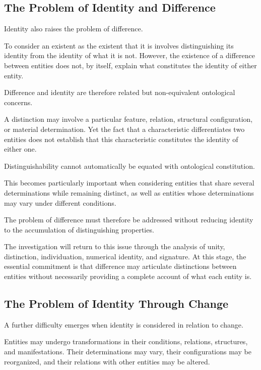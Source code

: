 \subsection{The Problem of Identity and Difference}

Identity also raises the problem of difference.

To consider an existent as the existent that
it is involves distinguishing its identity
from the identity of what it is not. However,
the existence of a difference between entities
does not, by itself, explain what constitutes
the identity of either entity.

Difference and identity are therefore related
but non-equivalent ontological concerns.

A distinction may involve a particular feature,
relation, structural configuration, or material
determination. Yet the fact that a characteristic
differentiates two entities does not establish
that this characteristic constitutes the
identity of either one.

Distinguishability cannot automatically be
equated with ontological constitution.

This becomes particularly important when
considering entities that share several
determinations while remaining distinct,
as well as entities whose determinations
may vary under different conditions.

The problem of difference must therefore
be addressed without reducing identity
to the accumulation of distinguishing
properties.

The investigation will return to this issue
through the analysis of unity, distinction,
individuation, numerical identity, and
signature. At this stage, the essential
commitment is that difference may articulate
distinctions between entities without
necessarily providing a complete account
of what each entity is.



\subsection{The Problem of Identity Through Change}

A further difficulty emerges when identity
is considered in relation to change.

Entities may undergo transformations in
their conditions, relations, structures,
and manifestations. Their determinations
may vary, their configurations may be
reorganized, and their relations with
other entities may be altered.

